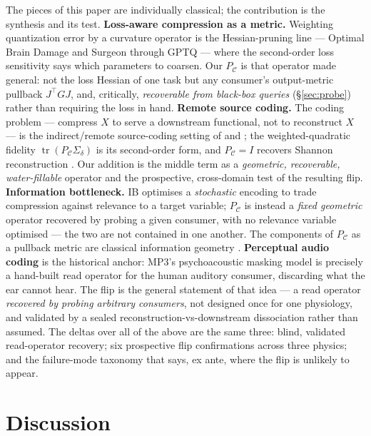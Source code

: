 \documentclass[10pt]{article} %
\theoremstyle{remark}
\newcommand{\PC}{P_{\mathcal{C}}}
\newcommand{\Sd}{\Sigma_{\delta}}
\newcommand{\tr}{\operatorname{tr}}
\begin{document}
The pieces of this paper are individually classical; the contribution is the synthesis and
its test. \textbf{Loss-aware compression as a metric.} Weighting quantization error by a
curvature operator is the Hessian-pruning line --- Optimal Brain Damage and Surgeon
\citep{lecun1990obd,hassibi1993obs} through GPTQ \citep{frantar2023gptq} --- where the
second-order loss sensitivity says which parameters to coarsen. Our $\PC$ is that operator
made general: not the loss Hessian of one task but any consumer's output-metric pullback
$J^\top G J$, and, critically, \emph{recoverable from black-box queries} (\S\ref{sec:probe})
rather than requiring the loss in hand. \textbf{Remote source coding.} The coding problem
--- compress $X$ to serve a downstream functional, not to reconstruct $X$ --- is the
indirect/remote source-coding setting of \citet{dobrushin1962} and \citet{wolfziv1970};
the weighted-quadratic fidelity $\tr(\PC\Sd)$ is its second-order form, and $\PC=I$ recovers
Shannon reconstruction \citep{shannon1959,cover2006}. Our addition is the middle term as a
\emph{geometric, recoverable, water-fillable} operator and the prospective, cross-domain
test of the resulting flip. \textbf{Information bottleneck.} IB \citep{tishby1999ib}
optimises a \emph{stochastic} encoding to trade compression against relevance to a target
variable; $\PC$ is instead a \emph{fixed geometric} operator recovered by probing a given
consumer, with no relevance variable optimised --- the two are not contained in one another.
The components of $\PC$ as a pullback metric are classical information geometry
\citep{amari2000}. \textbf{Perceptual audio coding} is the historical anchor: MP3's
psychoacoustic masking model \citep{painter2000perceptual} is precisely a hand-built read
operator for the human auditory consumer, discarding what the ear cannot hear. The flip is
the general statement of that idea --- a read operator \emph{recovered by probing arbitrary
consumers}, not designed once for one physiology, and validated by a sealed
reconstruction-vs-downstream dissociation rather than assumed. The deltas over all of the
above are the same three: blind, validated read-operator recovery; six prospective flip
confirmations across three physics; and the failure-mode taxonomy that says, ex ante, where
the flip is unlikely to appear.

\section{Discussion}\label{sec:discussion}
\end{document}
